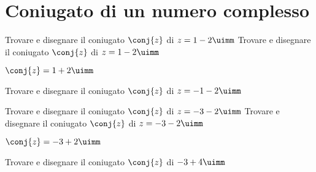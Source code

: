  \section{Coniugato di un numero complesso}
 \begin{exercise}
Trovare e disegnare il coniugato $\conj{z}$ di $z=1-2\uimm$
\tcblower
Trovare e disegnare il coniugato $\conj{z}$ di $z=1-2\uimm$

$\conj{z}=1+2\uimm$
\begin{center}

\label{fig:disegnopianocomplesso05}
\end{center}
 \end{exercise}
 \begin{exercise}[no solution]
Trovare e disegnare il coniugato $\conj{z}$ di $z=-1-2\uimm$
 \end{exercise}
  \begin{exercise}
  Trovare e disegnare il coniugato $\conj{z}$ di $z=-3-2\uimm$
  	\tcblower
  	  Trovare e disegnare il coniugato $\conj{z}$ di $z=-3-2\uimm$
  	  
  	  $\conj{z}=-3+2\uimm$
  	\begin{center}
  		
  		\label{fig:disegnopianocomplesso06}
  	\end{center}
  \end{exercise}
 \begin{exercise}[no solution]
 		  Trovare e disegnare il coniugato $\conj{z}$ di $-3+4\uimm$
 \end{exercise}
 